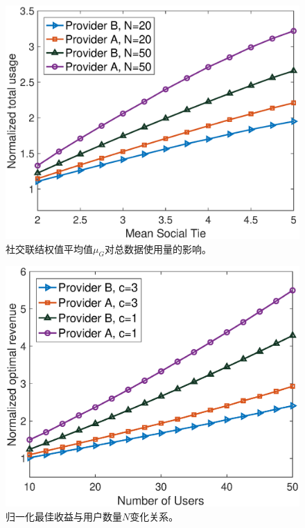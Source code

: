 \begin{figure}[t]
\centering
\includegraphics[scale=0.54]{./pic/normusage2.eps}
\vspace{-0.0cm}
\caption{社交联结权值平均值$\mu_{G}$对总数据使用量的影响。}\label{fg:Fig1}
\end{figure}

\begin{figure}[htb]
\centering
\includegraphics[scale=0.54]{./pic/normrev2.eps}
\vspace{-0.0cm}
\caption{归一化最佳收益与用户数量$N$变化关系。}\label{fg:Fig2}
\end{figure}

